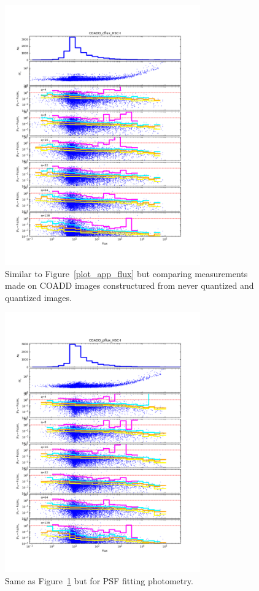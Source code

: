 \begin{figure}
\centering
\includegraphics[width=0.75\textwidth]{figure/plot_coadd_cflux_HSC-I.png}
\caption{Similar to Figure~\ref{plot_app_flux} but comparing measurements made on COADD images constructured from 
never quantized and quantized images.}
\label{coadd_app_flux}
\end{figure}

\begin{figure}
\centering
\includegraphics[width=0.75\textwidth]{figure/plot_coadd_pflux_HSC-I.png}
\caption{Same as Figure~\ref{coadd_app_flux} but for PSF fitting photometry.}
\label{coadd_psf_flux}
\end{figure}


